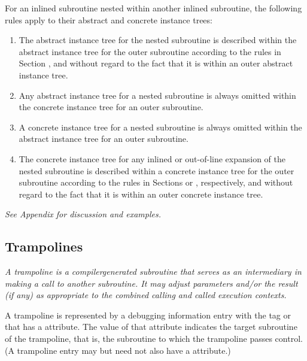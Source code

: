 For an inlined subroutine nested within another inlined
subroutine, the following rules apply to their abstract and
concrete instance trees:

\begin{enumerate}[1. ]
\item The abstract instance tree for the nested subroutine is
described within the abstract instance tree for the outer
subroutine according to the rules in 
Section , and
without regard to the fact that it is within an outer abstract
instance tree.

\item Any abstract instance tree for a nested subroutine is
always omitted within the concrete instance tree for an
outer subroutine.

\item  A concrete instance tree for a nested subroutine is
always omitted within the abstract instance tree for an
outer subroutine.

\item The concrete instance tree for any inlined or 
out-of-line
expansion of the nested subroutine is described within a
concrete instance tree for the outer subroutine according
to the rules in 
Sections  or 
, respectively,
and without regard to the fact that it is within an outer
concrete instance tree.
\end{enumerate}

\textit{See Appendix  
for discussion and examples.}

\subsection{Trampolines}
\label{chap:trampolines}

\textit{A trampoline is a compiler\dash generated subroutine that serves 
as\hypertarget{chap:DWATtrampolinetargetsubroutine}{}
an intermediary in making a call to another subroutine. It may
adjust parameters and/or the result (if any) as appropriate
to the combined calling and called execution contexts.}

A trampoline is represented by a debugging information entry
with the tag \DWTAGsubprogram{} or \DWTAGinlinedsubroutine{}
that has 
a \DWATtrampolineDEFN{} attribute. 
The value of that
attribute indicates the target subroutine of the trampoline,
that is, the subroutine to which the trampoline passes
control. (A trampoline entry may but need not also have a
\DWATartificial{} attribute.)

